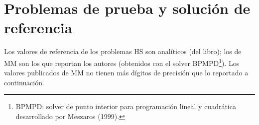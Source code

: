 %

\section*{Problemas de prueba y solución de referencia}

Los valores de referencia de los problemas HS son analíticos (del libro); los de MM son los que reportan los autores (obtenidos con el solver BPMPD\footnote{BPMPD: solver de punto interior para programación lineal y cuadrática desarrollado por Meszaros (1999).}).
Los valores publicados de MM no tienen más dígitos de precisión que lo reportado a continuación.

